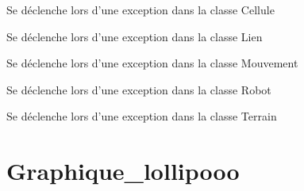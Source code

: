 \documentclass[letterpaper,10pt,english]{sphinxmanual}
\begin{document}
\begin{fulllineitems}
\label{index:Exceptions.CelluleException}
Se déclenche lors d'une exception dans la classe Cellule

\end{fulllineitems}


\begin{fulllineitems}
\label{index:Exceptions.LienException}
Se déclenche lors d'une exception dans la classe Lien

\end{fulllineitems}


\begin{fulllineitems}
\label{index:Exceptions.MouvementException}
Se déclenche lors d'une exception dans la classe Mouvement

\end{fulllineitems}


\begin{fulllineitems}
\label{index:Exceptions.RobotException}
Se déclenche lors d'une exception dans la classe Robot

\end{fulllineitems}


\begin{fulllineitems}
\label{index:Exceptions.TerrainException}
Se déclenche lors d'une exception dans la classe Terrain

\end{fulllineitems}



\chapter{Graphique\_lollipooo}
\label{index:graphique-lollipooo}
\end{document}
